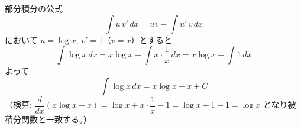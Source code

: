 
部分積分の公式
\[
\int u\, v' \, dx = uv - \int u'\, v \, dx
\]
において $u = \log x$, $v' = 1$（$v = x$）とすると
\[
\int \log x \, dx = x\log x - \int x\cdot\frac{1}{x}\, dx = x\log x - \int 1 \, dx
\]
よって
\[
\boxed{\; \int \log x \, dx = x\log x - x + C \;}
\]
（検算: $\dfrac{d}{dx}(x\log x - x) = \log x + x\cdot\dfrac{1}{x} - 1 = \log x + 1 - 1 = \log x$ となり被積分関数と一致する。）
